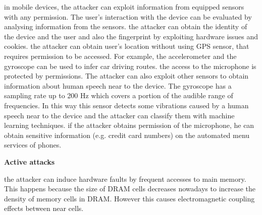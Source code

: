 \begin{itemize}
{in mobile devices, the attacker can exploit information from equipped sensors with any permission. The user's interaction with the device can be evaluated by analysing information from the sensors.}
{the attacker can obtain the identity of the device and the user and also the fingerprint by exploiting hardware issues and cookies.}
{the attacker can obtain user's location without using GPS sensor, that requires permission to be accessed. For example, the accelerometer and the gyroscope can be used to infer car driving routes.}
{the access to the microphone is protected by permissions. The attacker can also exploit other sensors to obtain information about human speech near to the device. The gyroscope has a sampling rate up to 200 Hz which covers a portion of the audible range of frequencies. In this way this sensor detects some vibrations caused by a human speech near to the device and the attacker can classify them with machine learning techniques.}
{if the attacker obtains permission of the microphone, he can obtain sensitive information (e.g. credit card numbers) on the automated menu services of phones.}
\end{itemize}
\vspace{2cm}
\textbf{Active attacks}
\begin{itemize}
{the attacker can induce hardware faults by frequent accesses to main memory. This happens because the size of DRAM cells decreases nowadays to increase the density of memory cells in DRAM. However this causes electromagnetic coupling effects between near cells.}
\end{itemize}

